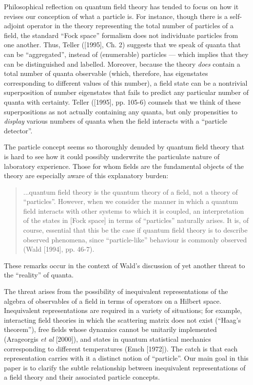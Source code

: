 \documentclass[12pt]{article}
\theoremstyle{remark}
\theoremstyle{definition}
\begin{document}
Philosophical reflection on quantum field theory has tended to focus
on how it revises our conception of what a particle is.  For instance,
though there is a self-adjoint operator in the theory representing the
total number of particles of a field, the standard ``Fock space''
formalism does not individuate particles from one another.  Thus,
Teller ([1995], Ch. 2) suggests that we speak of quanta that can be
``aggregated'', instead of (enumerable) particles --- which implies
that they can be distinguished and labelled.  Moreover, because the
theory \emph{does} contain a total number of quanta observable (which,
therefore, has eigenstates corresponding to different values of this
number), a field state can be a nontrivial superposition of number
eigenstates that fails to predict any particular number of quanta with
certainty.  Teller ([1995], pp. 105-6) counsels that we think of these
superpositions as not actually containing any quanta, but only
propensities to \emph{display} various numbers of quanta when the
field interacts with a ``particle detector''.

The particle concept seems so thoroughly denuded by quantum field
theory that is hard to see how it could possibly underwrite the
particulate nature of laboratory experience.  Those for whom fields
are the fundamental objects of the theory are especially aware of this
explanatory burden:

\begin{quote}
...quantum field theory is the quantum theory of a field, not a theory of
``particles''. However, when we consider the manner in which a quantum field
interacts with other systems to which it is coupled, an interpretation of
the states in [Fock space] in terms of ``particles'' naturally arises. It
is, of course, essential that this be the case if quantum field
theory is to describe observed phenomena, since ``particle-like'' behaviour
is commonly observed (Wald [1994], pp. 46-7).
\end{quote}

\noindent These remarks occur in the context of Wald's discussion of 
yet another threat to the ``reality'' of quanta.  

The threat arises from the possibility of inequivalent representations
of the algebra of observables of a field in terms of operators on a
Hilbert space.  Inequivalent representations are required in a variety
of situations; for example, interacting field theories in which the
scattering matrix does not exist (``Haag's theorem''), free fields
whose dynamics cannot be unitarily implemented (Arageorgis \emph{et
  al} [2000]), and states in quantum statistical mechanics
corresponding to different temperatures (Emch [1972]).  The catch is
that each representation carries with it a distinct notion of
``particle''.  Our main goal in this paper is to clarify the subtle
relationship between inequivalent representations of a field theory
and their associated particle concepts.
\end{document}
